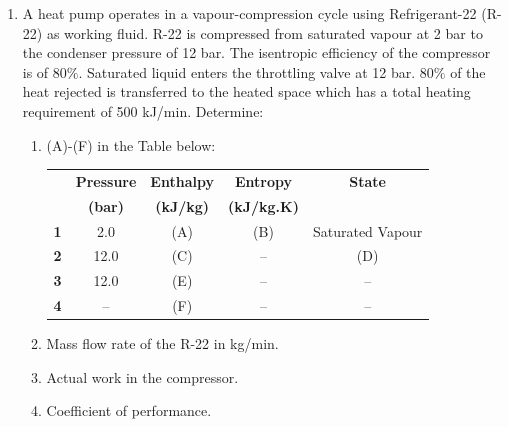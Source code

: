 \documentclass[12pts,a4paper,amsmath,amssymb,floatfix]{article}%
\begin{document}
\begin{enumerate}[label=\bfseries Problem \arabic*]
\item \label{Ex10} A heat pump operates in a vapour-compression cycle using Refrigerant-22 (R-22) as working fluid.  R-22 is compressed from saturated vapour at 2 bar to the condenser pressure of 12 bar.  The isentropic efficiency of the compressor is of 80$\%$. Saturated liquid enters the throttling valve at 12 bar. 80$\%$ of the heat rejected is transferred to the heated space which has a total heating requirement of 500 kJ/min. Determine:
\begin{enumerate}
\item (A)-(F) in the Table below:

\begin{center}
\begin{tabular}{ || c || c | c | c | c || }
\hline\hline
        & {\bf Pressure}  &  {\bf Enthalpy}  & {\bf Entropy}     & {\bf State}  \\
        & {\bf (bar)}     &  {\bf (kJ/kg)}   &  {\bf (kJ/kg.K)}  &              \\
\hline\hline
{\bf 1} &   2.0           &       (A)        &      (B)          &  Saturated Vapour \\
{\bf 2} &   12.0          &       (C)        &      --           &  (D)          \\
{\bf 3} &   12.0          &       (E)        &      --           &  --        \\
{\bf 4} &   --            &       (F)        &      --           &  --       \\ 
\hline\hline
\end{tabular}
\end{center}

\item Mass flow rate of the R-22 in kg/min.
\item Actual work in the compressor.
\item Coefficient of performance.

\end{enumerate}



\end{enumerate}
\end{document}
